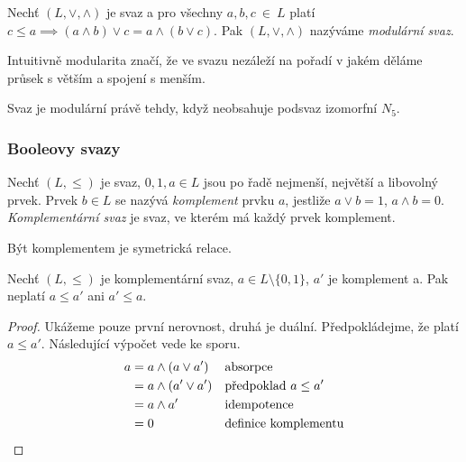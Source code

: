 \begin{definition}
    Nechť $(L, \vee, \wedge)$ je svaz a pro všechny $a, b, c~\in~L$
    platí
    $c \leq a \implies (a \wedge b) \vee c = a \wedge (b \vee c)$.
    Pak $(L, \vee, \wedge)$ nazýváme {\em modulární svaz}.
\end{definition}

Intuitivně modularita značí, že
ve svazu nezáleží na pořadí v jakém děláme průsek
s větším a spojení s menším.


\begin{claim}
    Svaz je modulární právě tehdy, když neobsahuje podsvaz izomorfní
    $N_5$.
\end{claim}

\subsubsection{Booleovy svazy}

\begin{definition}
Nechť $(L, \leq)$ je svaz, $0, 1, a \in L$ jsou po řadě nejmenší, největší a libovolný prvek.
Prvek $b \in L$ se nazývá {\em komplement} prvku $a$, jestliže
$a \vee b = 1$, $a \wedge b = 0$.
{\em Komplementární svaz} je svaz, ve kterém má každý prvek komplement.
\end{definition}

Být komplementem je symetrická relace.

\begin{claim}
    \label{complements_incomparable}
    Nechť $(L, \leq)$ je komplementární svaz, $a \in L \setminus
    \{0,1\}$, $a'$ je komplement a.
    Pak neplatí $a \leq a'$ ani $a' \leq a$.
\end{claim}
\begin{proof}
    Ukážeme pouze první nerovnost, druhá je duální.
    Předpokládejme, že platí $a \leq a'$. Následující výpočet vede ke
    sporu.
\begin{align*}
    a &= a \wedge (a \vee a')  && \text{absorpce}\\
      &= a \wedge (a' \vee a') && \text{předpoklad } a \leq a'\\
      &= a \wedge a' && \text{idempotence}\\
      &= 0 && \text{definice komplementu}
\qedhere
\end{align*}
\end{proof}

